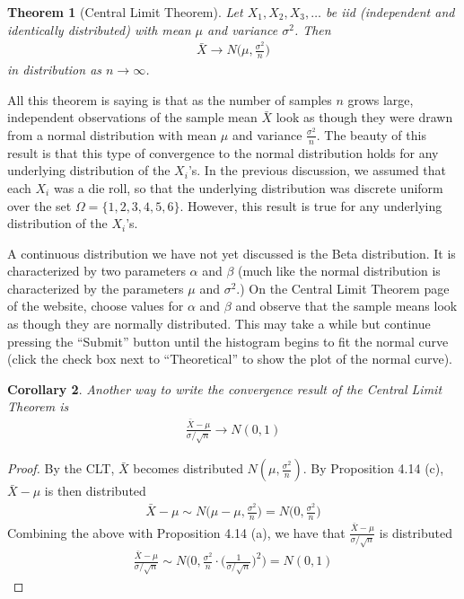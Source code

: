 \documentclass[11pt,letterpaper]{article}
\newtheorem{theorem}{Theorem}
\numberwithin{theorem}{section}
\numberwithin{definition}{section}
\numberwithin{lemma}{section}
\newtheorem{corollary}[theorem]{Corollary}
\numberwithin{corollary}{section}
\numberwithin{proposition}{section}
\theoremstyle{definition}
\numberwithin{remark}{section}
\numberwithin{claim}{section}
\numberwithin{observation}{section}
\numberwithin{fact}{section}
\numberwithin{assumption}{section}
\numberwithin{example}{section}
\numberwithin{exercise}{section}
\begin{document}
\begin{theorem}[Central Limit Theorem]
Let $X_1,X_2,X_3,\dots$ be iid (independent and identically distributed) with mean $\mu$ and variance $\sigma^2$. Then
\begin{align*}
\bar{X} \to N\Big(\mu,\frac{\sigma^2}{n}\Big)
\end{align*}
in distribution as $n\to \infty$.
\end{theorem}
All this theorem is saying is that as the number of samples $n$ grows large, independent observations of the sample mean $\bar{X}$ look as though they were drawn from a normal distribution with mean $\mu$ and variance $\frac{\sigma^2}{n}$. The beauty of this result is that this type of convergence to the normal distribution holds for any underlying distribution of the $X_i$'s. In the previous discussion, we assumed that each $X_i$ was a die roll, so that the underlying distribution was discrete uniform over the set $\Omega = \{1,2,3,4,5,6\}$. However, this result is true for any underlying distribution of the $X_i$'s.

A continuous distribution we have not yet discussed is the Beta distribution. It is characterized by two parameters $\alpha$ and $\beta$ (much like the normal distribution is characterized by the parameters $\mu$ and $\sigma^2$.) On the Central Limit Theorem page of the website, choose values for $\alpha$ and $\beta$ and observe that the sample means look as though they are normally distributed. This may take a while but continue pressing the ``Submit'' button until the histogram begins to fit the normal curve (click the check box next to ``Theoretical'' to show the plot of the normal curve).

\begin{corollary}
Another way to write the convergence result of the Central Limit Theorem is
\begin{align*}
\frac{\bar{X} - \mu}{\sigma/\sqrt{n}} \to N(0,1)
\end{align*}
\end{corollary}
\begin{proof}
By the CLT, $\bar{X}$ becomes distributed $N(\mu, \frac{\sigma^2}{n})$. By Proposition 4.14 (c), $\bar{X} - \mu$ is then distributed
\begin{align*}
\bar{X} - \mu \sim N\Big(\mu - \mu, \frac{\sigma^2}{n}\Big) = N\Big(0, \frac{\sigma^2}{n}\Big)
\end{align*}
Combining the above with Proposition 4.14 (a), we have that $\frac{\bar{X} - \mu}{\sigma/\sqrt{n}}$ is distributed
\begin{align*}
\frac{\bar{X} - \mu}{\sigma / \sqrt{n}} \sim N\Big(0, \frac{\sigma^2}{n} \cdot \Big(\frac{1}{\sigma / \sqrt{n}}\Big)^2 \Big) = N(0,1)
\end{align*}

\end{proof}
\end{document}
